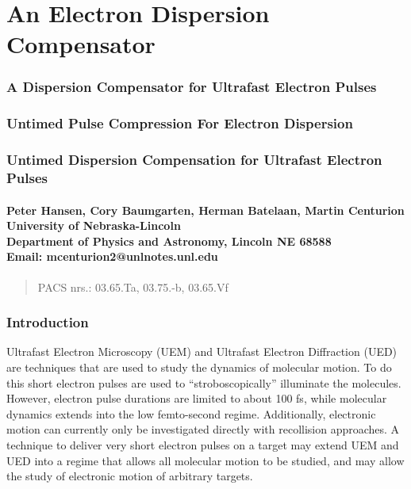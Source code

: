 \documentclass[12pt,letterpaper]{article}
\begin{document}
{
\centering
\part*{An Electron Dispersion Compensator}
\section*{A Dispersion Compensator for Ultrafast Electron Pulses}
\section*{Untimed Pulse Compression For Electron Dispersion}
\section*{Untimed Dispersion Compensation for Ultrafast Electron Pulses}

\subsection*{Peter Hansen, Cory Baumgarten, Herman Batelaan, Martin Centurion\\
University of Nebraska-Lincoln\\
Department of Physics and Astronomy, Lincoln NE 68588\\
Email: mcenturion2@unlnotes.unl.edu}
}

\begin{abstract}
   PACS nrs.: 03.65.Ta, 03.75.-b, 03.65.Vf
\end{abstract}

   \section{Introduction}

Ultrafast Electron Microscopy (UEM) and Ultrafast Electron Diffraction (UED) are techniques that are used to study the dynamics of molecular motion. To do this short electron pulses are used to ``stroboscopically'' illuminate the molecules. However, electron pulse durations are limited to about 100 fs, while molecular dynamics extends into the low femto-second regime. Additionally, electronic motion can currently only be investigated directly with recollision approaches. A technique to deliver very short electron pulses on a target may extend UEM and UED into a regime that allows all molecular motion to be studied, and may allow the study of electronic motion of arbitrary targets.
\end{document}
